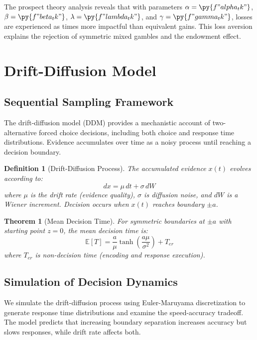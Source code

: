 \documentclass[a4paper, 11pt]{article}
\newtheorem{definition}{Definition}[section]
\newtheorem{theorem}{Theorem}[section]
\begin{document}
The prospect theory analysis reveals that with parameters $\alpha = \py{f"{alpha_tk}"}$,
$\beta = \py{f"{beta_tk}"}$, $\lambda = \py{f"{lambda_tk}"}$, and $\gamma = \py{f"{gamma_tk}"}$,
losses are experienced as  times more impactful than equivalent
gains. This loss aversion explains the rejection of symmetric mixed gambles and the endowment effect.

\section{Drift-Diffusion Model}

\subsection{Sequential Sampling Framework}

The drift-diffusion model (DDM) provides a mechanistic account of two-alternative forced choice
decisions, including both choice and response time distributions. Evidence accumulates over time
as a noisy process until reaching a decision boundary.

\begin{definition}[Drift-Diffusion Process]
The accumulated evidence $x(t)$ evolves according to:
\begin{equation}
dx = \mu \, dt + \sigma \, dW
\end{equation}
where $\mu$ is the drift rate (evidence quality), $\sigma$ is diffusion noise, and $dW$ is a
Wiener increment. Decision occurs when $x(t)$ reaches boundary $\pm a$.
\end{definition}

\begin{theorem}[Mean Decision Time]
For symmetric boundaries at $\pm a$ with starting point $z=0$, the mean decision time is:
\begin{equation}
\mathbb{E}[T] = \frac{a}{\mu} \tanh\left(\frac{a\mu}{\sigma^2}\right) + T_{er}
\end{equation}
where $T_{er}$ is non-decision time (encoding and response execution).
\end{theorem}

\subsection{Simulation of Decision Dynamics}

We simulate the drift-diffusion process using Euler-Maruyama discretization to generate response
time distributions and examine the speed-accuracy tradeoff. The model predicts that increasing
boundary separation increases accuracy but slows responses, while drift rate affects both.
\end{document}
